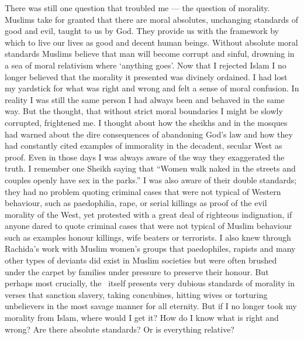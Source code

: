 \documentclass[12pt]{memoir}
\begin{document}
There was still one question that troubled me — the question of morality.
Muslims take for granted that there are moral absolutes,
unchanging standards of good and evil, taught to us by God.
They provide us with the framework by which to live our lives
as good and decent human beings.
Without absolute moral standards Muslims believe
that man will become corrupt and sinful,
drowning in a sea of moral relativism where ‘anything goes’.
Now that I rejected Islam I no longer believed
that the morality it presented was divinely ordained.
I had lost my yardstick for what was right and wrong
and felt a sense of moral confusion.
In reality I was still the same person I had always been
and behaved in the same way.
But the thought, that without strict moral boundaries
I might be slowly corrupted, frightened me.
I thought about how the sheikhs and  in the mosques
had warned about the dire consequences of abandoning God’s law
and how they had constantly cited examples of immorality
in the decadent, secular West as proof.
Even in those days I was always aware of the way they exaggerated the truth.
I remember one Sheikh saying that
“Women walk naked in the streets and couples openly have sex in the parks.”
I was also aware of their double standards;
they had no problem quoting criminal cases that were not typical
of Western behaviour, such as paedophilia, rape, or serial killings
as proof of the evil morality of the West,
yet protested with a great deal of righteous indignation,
if anyone dared to quote criminal cases that were not typical
of Muslim behaviour such as examples honour killings,
wife beaters or terrorists.
I also knew through Rachida’s work with Muslim women’s groups
that paedophiles, rapists and many other types of deviants
did exist in Muslim societies but were often brushed under the carpet
by families under pressure to preserve their honour.
But perhaps most crucially, the \Quran\ itself presents
very dubious standards of morality in verses that sanction slavery,
taking concubines, hitting wives or torturing unbelievers
in the most savage manner for all eternity.
But if I no longer took my morality from Islam, where would I get it?
How do I know what is right and wrong?
Are there absolute standards?
Or is everything relative?
\end{document}
